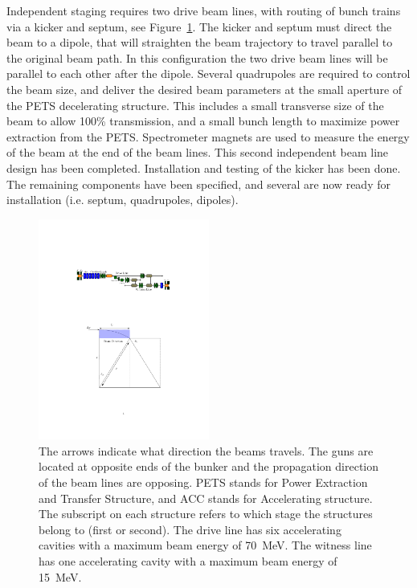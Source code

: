 \documentclass[aps,prab,preprint,groupedaddress,linenumbers]{revtex4-2}
\begin{document}
Independent staging requires two drive beam lines, with routing of bunch trains via a kicker and septum, 
see Figure~\ref{fig:full-staging}. The kicker and septum must direct the beam to a dipole, 
that will straighten the beam trajectory to travel parallel to the original beam path. 
In this configuration the two drive beam lines will be parallel to each other after the dipole.
Several quadrupoles are required to control the beam size, and deliver the desired beam parameters
at the small aperture of the PETS decelerating structure. 
This includes a small transverse size of the beam to allow 100\% transmission, 
and a small bunch length to maximize power extraction from the PETS.
Spectrometer magnets are used to measure the energy of the beam at the end of the beam lines.
This second independent beam line design has been completed. 
Installation and testing of the kicker has been done.  
The remaining components have been specified, and several are now ready for installation (i.e. septum, quadrupoles, dipoles).
\begin{figure}
\includegraphics[width=0.5\textwidth]{full_staging}
	\caption{The arrows indicate what direction the beams travels.
		The guns are located at opposite ends of the bunker and 
		the propagation direction of the beam lines are opposing.
		PETS stands for Power Extraction and Transfer Structure, and ACC stands for Accelerating structure. 
		The subscript on each structure refers to which stage the structures belong to (first or second). 
		The drive line has six accelerating cavities with a maximum beam energy of \SI{70}{MeV}. 
		The witness line has one accelerating cavity with a maximum beam energy of \SI{15}{MeV}.}
	\label{fig:full-staging}
\end{figure}
\end{document}
